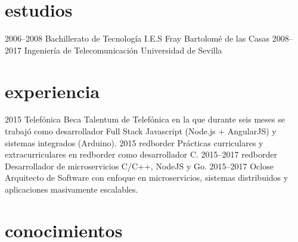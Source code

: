 \documentclass[hidelinks]{friggeri-cv} %
\begin{document}

\section{estudios}

\begin{entrylist}
 \entry
 {2006--2008}
 {Bachillerato {\normalfont{} de Tecnología}}
 {I.E.S Fray Bartolomé de las Casas}
 {}
 \entry
 {2008--2017}
 {Ingeniería {\normalfont{} de Telecomunicación}}
 {Universidad de Sevilla}
 {}
\end{entrylist}


\section{experiencia}

\begin{entrylist}
 \entry
 {2015}
 {Telefónica}
 {}
 {
  Beca Talentum de Telefónica en la que durante seis meses se trabajó como
  desarrollador Full Stack Javascript (Node.js + AngularJS) y sistemas
  integrados (Arduino).
 }
 \entry
 {2015}
 {redborder}
 {}
 {
  Prácticas curriculares y extracurriculares en redborder como desarrollador C.
 }
 \entry
 {2015--2017}
 {redborder}
 {}
 {
  Desarrollador de microservicios C/C++, NodeJS y Go.
 }
 \entry
 {2015--2017}
 {Oclose}
 {}
 {
  Arquitecto de Software con enfoque en microservicios, sistemas distribuidos
  y aplicaciones masivamente escalables.
 }
\end{entrylist}


\section{conocimientos}
\end{document}
